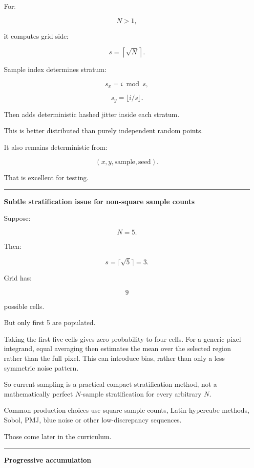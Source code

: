For:

\[
N>1,
\]

it computes grid side:

\[
s=
\left\lceil
\sqrt N
\right\rceil.
\]

Sample index determines stratum:

\[
s_x=i\bmod s,
\]

\[
s_y=\lfloor i/s\rfloor.
\]

Then adds deterministic hashed jitter inside each stratum.

This is better distributed than purely independent random points.

It also remains deterministic from:

\[
(x,y,\text{sample},\text{seed}).
\]

That is excellent for testing.

\begin{center}\rule{0.5\linewidth}{0.5pt}\end{center}

\textbf{Subtle stratification issue for non-square sample counts}

Suppose:

\[
N=5.
\]

Then:

\[
s=\lceil\sqrt5\rceil=3.
\]

Grid has:

\[
9
\]

possible cells.

But only first 5 are populated.

Taking the first five cells gives zero probability to four cells. For a generic pixel integrand, equal averaging then estimates the mean over the selected region rather than the full pixel. This can introduce bias, rather than only a less symmetric noise pattern.

So current sampling is a practical compact stratification method, not a mathematically perfect \(N\)-sample stratification for every arbitrary \(N\).

Common production choices use square sample counts, Latin-hypercube methods, Sobol, PMJ, blue noise or other low-discrepancy sequences.

Those come later in the curriculum.

\begin{center}\rule{0.5\linewidth}{0.5pt}\end{center}

\textbf{Progressive accumulation}

